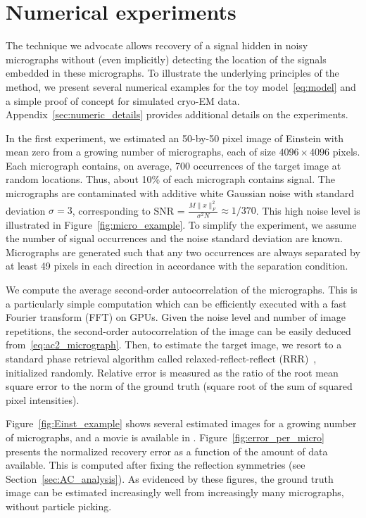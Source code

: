\documentclass[9pt,twocolumn,twoside,lineno]{pnas-new}
\begin{document}
\section{Numerical experiments}



The technique we advocate allows recovery of a signal hidden in noisy micrographs without (even implicitly)  detecting the location  of the signals embedded in these micrographs. To illustrate the underlying principles of the method, we present several numerical examples for the toy model~\eqref{eq:model} and a simple proof of concept for simulated cryo-EM data.  Appendix~\ref{sec:numeric_details} provides additional details on the experiments.

In the first experiment, we estimated 
an 50-by-50 pixel image of Einstein with mean zero from a growing number of micrographs, each of size $4096\times 4096$ pixels. Each micrograph contains, on average, 700 occurrences of the target image at random locations. 
Thus, about 10\% of each micrograph contains signal. The micrographs are contaminated with additive white Gaussian noise with standard deviation $\sigma=3$,  corresponding  to SNR = $\frac{M\|x\|_F^2} {\sigma^2N} \approx1/370$. This high noise level is illustrated in Figure~\ref{fig:micro_example}. 
To simplify the experiment, we assume the number of signal occurrences and the noise standard deviation are known. Micrographs are generated such that any two occurrences are always separated by at least 49 pixels in each direction in accordance with the separation condition. %

We compute the average second-order autocorrelation of the micrographs. This is a particularly simple computation which can be efficiently executed with a fast Fourier transform (FFT) on GPUs. Given the noise level and number of image repetitions, the second-order autocorrelation of the image can be easily deduced from~\eqref{eq:ac2_micrograph}.  Then, to estimate the target image, we resort to a standard phase retrieval algorithm called relaxed-reflect-reflect (RRR)~\cite{elser2017rrr}, initialized randomly.
Relative error is measured as the ratio of the root mean square error to the norm of the ground truth (square root of the sum of squared pixel intensities).

Figure~\ref{fig:Einst_example} shows several estimated images for a growing number of micrographs, and a movie is available in . Figure~\ref{fig:error_per_micro} presents the normalized recovery error as a function of the amount of data available.  This is computed after fixing the reflection symmetries (see Section~\ref{sec:AC_analysis}). As evidenced by these figures, the ground truth image can be estimated increasingly well from increasingly many micrographs, without particle picking.
\end{document}
